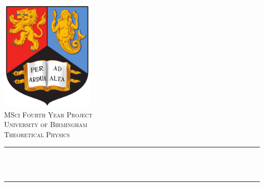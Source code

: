 \begin{titlepage}

\newcommand{\HRule}{\rule{\linewidth}{0.5mm}} %

\center %


\includegraphics[width=4.5cm]{title/UoB.png}\\[1cm] %
 



\textsc{\LARGE MSci Fourth Year Project}\\[1cm] %
\textsc{\Large University of Birmingham}\\[0.5cm] %
\textsc{\large Theoretical Physics}\\[0.5cm] %

\makeatletter
\HRule \\[0.4cm]
{ \huge \bfseries \@title}\\[0.4cm] %
\HRule \\[1.5cm]
 


\end{titlepage}
